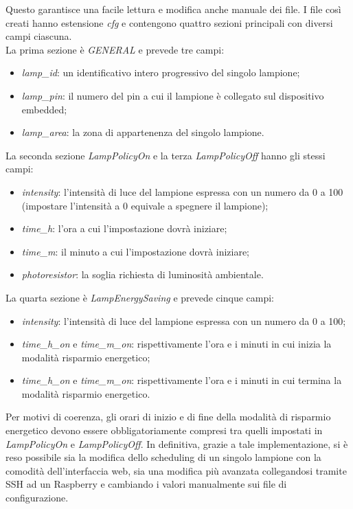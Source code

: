 Questo garantisce una facile lettura e modifica anche manuale dei file. I file così creati hanno estensione \textit{cfg} e contengono quattro sezioni principali con diversi campi ciascuna.
\\La prima sezione è \textit{GENERAL} e prevede tre campi:
\begin{itemize}
 \item \textit{lamp\_id}: un identificativo intero progressivo del singolo lampione;
 \item \textit{lamp\_pin}: il numero del pin a cui il lampione è collegato sul dispositivo embedded;
 \item \textit{lamp\_area}: la zona di appartenenza del singolo lampione.
\end{itemize}
La seconda sezione \textit{LampPolicyOn} e la terza \textit{LampPolicyOff} hanno gli stessi campi:
\begin{itemize}
 \item \textit{intensity}: l'intensità di luce del lampione espressa con un numero da 0 a 100 (impostare l'intensità a 0 equivale a spegnere il lampione);
 \item \textit{time\_h}: l'ora a cui l'impostazione dovrà iniziare;
 \item \textit{time\_m}: il minuto a cui l'impostazione dovrà iniziare;
 \item \textit{photoresistor}: la soglia richiesta di luminosità ambientale.
\end{itemize}
La quarta sezione è \textit{LampEnergySaving} e prevede cinque campi:
\begin{itemize}
 \item \textit{intensity}: l'intensità di luce del lampione espressa con un numero da 0 a 100;
 \item \textit{time\_h\_on} e \textit{time\_m\_on}: rispettivamente l'ora e i minuti in cui inizia la modalità risparmio energetico;
 \item \textit{time\_h\_on} e \textit{time\_m\_on}: rispettivamente l'ora e i minuti in cui termina la modalità risparmio energetico.
\end{itemize}
Per motivi di coerenza, gli orari di inizio e di fine della modalità di risparmio energetico devono essere obbligatoriamente compresi tra quelli impostati in \textit{LampPolicyOn} e \textit{LampPolicyOff}.
In definitiva, grazie a tale implementazione, si è reso possibile sia la modifica dello scheduling di un singolo lampione con la comodità dell'interfaccia web, sia una modifica più avanzata collegandosi tramite SSH ad un Raspberry e cambiando i valori manualmente sui file di configurazione.

